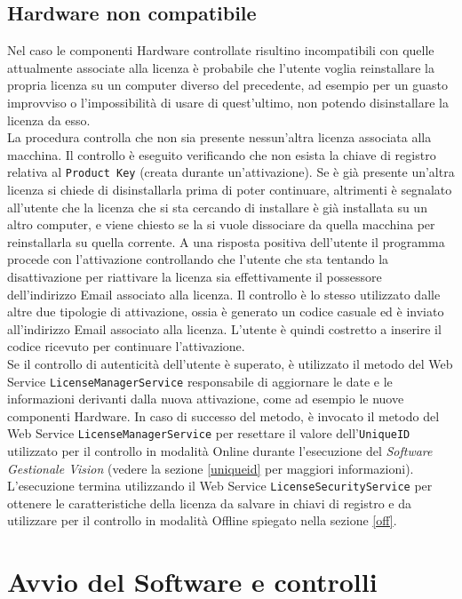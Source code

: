 \subsection{Hardware non compatibile}
\label{hnc}
Nel caso le componenti Hardware controllate risultino incompatibili con quelle attualmente associate alla licenza è probabile che l'utente voglia reinstallare la propria licenza su un computer diverso del precedente, ad esempio per un guasto improvviso o l'impossibilità di usare di quest'ultimo, non potendo disinstallare la licenza da esso. 
\\La procedura controlla che non sia presente nessun’altra licenza associata alla macchina. Il controllo è eseguito verificando che non esista la chiave di registro relativa al \texttt{Product Key} (creata durante un'attivazione). Se è già presente un’altra licenza si chiede di disinstallarla prima di poter continuare, altrimenti è segnalato all’utente che la licenza che si sta cercando di installare è già installata su un altro computer, e viene chiesto se la si vuole dissociare da quella macchina per reinstallarla su quella corrente. A una risposta positiva dell’utente il programma procede con l’attivazione controllando che l’utente che sta tentando la disattivazione per riattivare la licenza sia effettivamente il possessore dell'indirizzo Email associato alla licenza. Il controllo è lo stesso utilizzato dalle altre due tipologie di attivazione, ossia è generato un codice casuale ed è inviato all'indirizzo Email associato alla licenza. L'utente è quindi costretto a inserire il codice ricevuto per continuare l'attivazione.
\\
Se il controllo di autenticità dell'utente è superato, è utilizzato il metodo del Web Service \texttt{LicenseManagerService} responsabile di aggiornare le date e le informazioni derivanti dalla nuova attivazione, come ad esempio le nuove componenti Hardware. In caso di successo del metodo, è invocato il metodo del Web Service \texttt{LicenseManagerService} per resettare il valore dell’\texttt{UniqueID} utilizzato per il controllo in modalità Online durante l’esecuzione del \textit{Software Gestionale Vision} (vedere la sezione \ref{uniqueid} per maggiori informazioni).\\
L’esecuzione termina utilizzando il Web Service \texttt{LicenseSecurityService} per ottenere le caratteristiche della licenza da salvare in chiavi di registro e da utilizzare per il controllo in modalità Offline spiegato nella sezione \ref{off}. 


\section{Avvio del Software e controlli}

